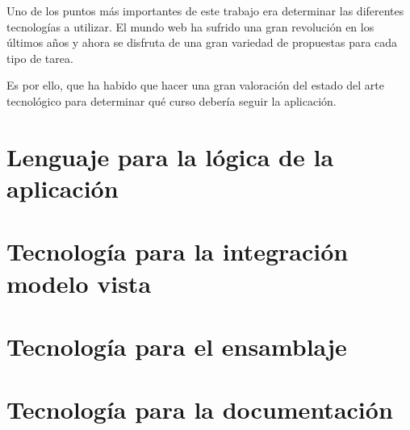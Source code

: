 
Uno de los puntos más importantes de este trabajo era determinar las diferentes tecnologías
a utilizar. El mundo web ha sufrido una gran revolución en los últimos años y ahora
se disfruta de una gran variedad de propuestas para cada tipo de tarea.

Es por ello, que ha habido que hacer una gran valoración del estado del arte 
tecnológico para determinar qué curso debería seguir la aplicación.

\section{Lenguaje para la lógica de la aplicación}
\label{4:sec1}


\section{Tecnología para la integración modelo vista}
\label{4:sec2}


\section{Tecnología para el ensamblaje}
\label{4:sec3}


\section{Tecnología para la documentación}
\label{4:sec4}

